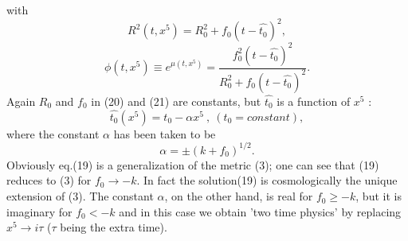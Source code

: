 \documentclass[a4paper,12pt]{article}
\begin{document}
with
\begin{equation}
R^2(t,x^5) =R^2_0 +f_0(t-\hat{t_0})^2  ,
\end{equation}
\begin{equation}
 \phi(t,x^5)  \equiv e^{\mu(t,x^5)}
 =\frac{f^2_0(t-\hat{t_0})^2}{R^2_0 + f_0(t-\hat{t_0})^2}  .
 \end{equation}
 Again $R_0$ and $f_0$ in (20) and (21) are constants, but
 $\hat{t_0}$ is a function of $x^5$ :
 \begin{equation}
 \hat{t_0}(x^5) = t_0 -\alpha x^5 \: , \: (t_0 =constant) ,
 \end{equation}
 where the constant $\alpha$ has been taken to be
 \begin{equation}
 \alpha = \pm (k + f_0) ^{1/2}  .
 \end{equation}
Obviously eq.(19) is a generalization of the metric (3); one can
see that (19) reduces to (3) for $f_0 \rightarrow -k$. In fact the
solution(19) is cosmologically the unique extension of (3). The
constant $\alpha$, on the other hand, is real for $f_0\geq -k$,
but it is imaginary for $f_0<-k$ and in this case we obtain 'two
time physics' \cite{bar} by replacing $x^5 \rightarrow i\tau$
($\tau$ being the extra time).
\end{document}
